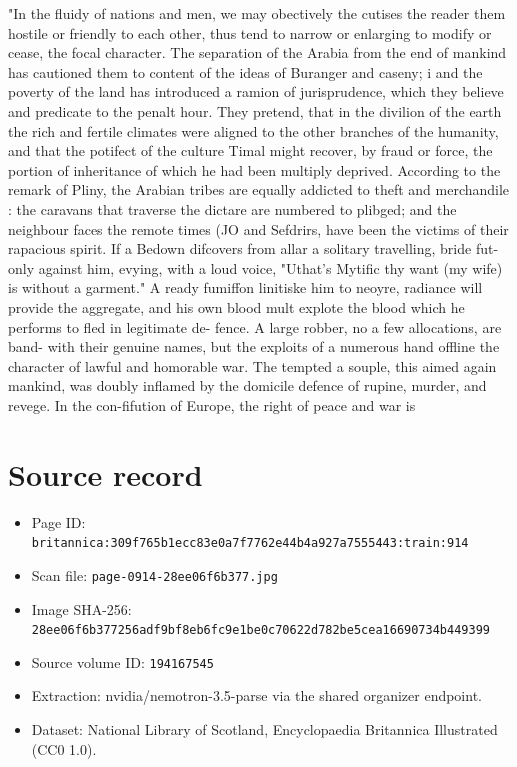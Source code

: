 \documentclass{article}
\begin{document}
"In the fluidy of nations and men, we may obectively the cutises the reader them hostile or friendly to each other, thus tend to narrow or enlarging to modify or cease, the focal character. The separation of the Arabia from the end of mankind has cautioned them to content of the ideas of Buranger and caseny; i and the poverty of the land has introduced a ramion of jurisprudence, which they believe and predicate to the penalt hour. They pretend, that in the divilion of the earth the rich and fertile climates were aligned to the other branches of the humanity, and that the potifect of the culture Timal might recover, by fraud or force, the portion of inheritance of which he had been multiply deprived. According to the remark of Pliny, the Arabian tribes are equally addicted to theft and merchandile : the caravans that traverse the dictare are numbered to plibged; and the neighbour faces the remote times (JO and Sefdrirs, have been the victims of their rapacious spirit. If a Bedown difcovers from allar a solitary travelling, bride fut-only against him, evying, with a loud voice, "Uthat's Mytific thy want (my wife) is without a garment." A ready fumiffon linitiske him to neoyre, radiance will provide the aggregate, and his own blood mult explote the blood which he performs to fled in legitimate de- fence. A large robber, no a few allocations, are band- with their genuine names, but the exploits of a numerous hand offline the character of lawful and homorable war. The tempted a souple, this aimed again mankind, was doubly inflamed by the domicile defence of rupine, murder, and revege. In the con-fifution of Europe, the right of peace and war is

\section*{Source record}
\begin{itemize}
\item Page ID: \texttt{britannica:309f765b1ecc83e0a7f7762e44b4a927a7555443:train:914}
\item Scan file: \texttt{page-0914-28ee06f6b377.jpg}
\item Image SHA-256: \texttt{28ee06f6b377256adf9bf8eb6fc9e1be0c70622d782be5cea16690734b449399}
\item Source volume ID: \texttt{194167545}
\item Extraction: nvidia/nemotron-3.5-parse via the shared organizer endpoint.
\item Dataset: National Library of Scotland, Encyclopaedia Britannica Illustrated (CC0 1.0).
\end{itemize}
\end{document}
